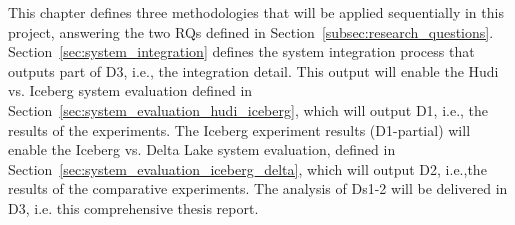 This chapter defines three methodologies that will be applied sequentially in this project, answering the two \glspl{RQ} defined in Section~\ref{subsec:research_questions}. Section~\ref{sec:system_integration} defines the system integration process that outputs part of \gls{D}3, i.e., the integration detail. This output will enable the Hudi vs. Iceberg system evaluation defined in Section~\ref{sec:system_evaluation_hudi_iceberg}, which will output \gls{D}1, i.e., the results of the experiments. The Iceberg experiment results (\gls{D}1-partial) will enable the Iceberg vs. Delta Lake system evaluation, defined in Section~\ref{sec:system_evaluation_iceberg_delta}, which will output \gls{D}2, i.e.,the results of the comparative experiments. The analysis of \glspl{D}1-2 will be delivered in \gls{D}3, i.e. this comprehensive thesis report.